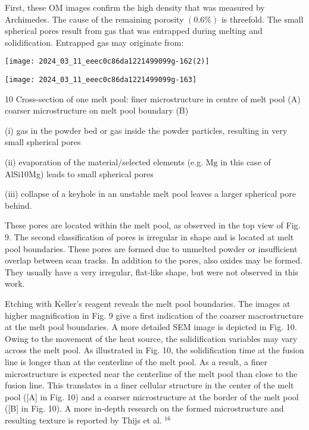 \documentclass[10pt]{article}
\begin{document}
First, these OM images confirm the high density that was measured by Archimedes. The cause of the remaining porosity $(0.6 \%)$ is threefold. The small spherical pores result from gas that was entrapped during melting and solidification. Entrapped gas may originate from:

\begin{center}
\texttt{[image: 2024\_03\_11\_eeec0c86da1221499099g-162(2)]}
\end{center}

\begin{center}
\texttt{[image: 2024\_03\_11\_eeec0c86da1221499099g-163]}
\end{center}

10 Cross-section of one melt pool: finer microstructure in centre of melt pool (A) coarser microstructure on melt pool boundary (B)

(i) gas in the powder bed or gas inside the powder particles, resulting in very small spherical pores

(ii) evaporation of the material/selected elements (e.g. $\mathrm{Mg}$ in this case of AlSi10Mg) leads to small spherical pores

(iii) collapse of a keyhole in an unstable melt pool leaves a larger spherical pore behind.

These pores are located within the melt pool, as observed in the top view of Fig. 9. The second classification of pores is irregular in shape and is located at melt pool boundaries. These pores are formed due to unmelted powder or insufficient overlap between scan tracks. In addition to the pores, also oxides may be formed. They usually have a very irregular, flat-like shape, but were not observed in this work.

Etching with Keller's reagent reveals the melt pool boundaries. The images at higher magnification in Fig. 9 give a first indication of the coarser macrostructure at the melt pool boundaries. A more detailed SEM image is depicted in Fig. 10. Owing to the movement of the heat source, the solidification variables may vary across the melt pool. As illustrated in Fig. 10, the solidification time at the fusion line is longer than at the centerline of the melt pool. As a result, a finer microstructure is expected near the centerline of the melt pool than close to the fusion line. This translates in a finer cellular structure in the center of the melt pool ([A] in Fig. 10) and a coarser microstructure at the border of the melt pool ([B] in Fig. 10). A more in-depth research on the formed microstructure and resulting texture is reported by Thijs et al. ${ }^{16}$
\end{document}
